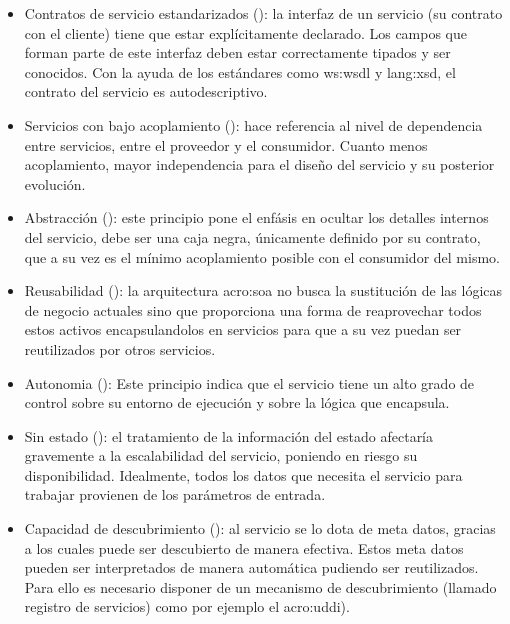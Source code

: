 
\begin{itemize}
  \item Contratos de servicio estandarizados (): la interfaz de un servicio (su contrato con el cliente) tiene que estar explícitamente declarado. Los campos  que forman parte de este interfaz deben estar correctamente tipados y ser conocidos. Con la ayuda de los estándares como \gls{ws:wsdl} y \gls{lang:xsd}, el contrato del servicio es autodescriptivo.

  \item Servicios con bajo acoplamiento (): hace referencia al nivel de dependencia entre servicios, entre el proveedor y el consumidor. Cuanto menos acoplamiento, mayor independencia para el diseño del servicio y su posterior evolución.

  \item Abstracción (): este principio pone el enfásis en ocultar los detalles internos del servicio, debe ser una caja negra, únicamente definido por su contrato, que a su vez es el mínimo acoplamiento posible con el consumidor del mismo.

  \item Reusabilidad (): la arquitectura \gls{acro:soa} no busca la sustitución de las lógicas de negocio actuales sino que proporciona una forma de reaprovechar todos estos activos encapsulandolos en servicios para que a su vez puedan ser reutilizados por otros servicios.

  \item Autonomia (): Este principio indica que el servicio tiene un alto grado de control sobre su entorno de ejecución y sobre la lógica que encapsula.

  \item Sin estado (): el tratamiento de la información del estado afectaría gravemente a la escalabilidad del servicio, poniendo en riesgo su disponibilidad. Idealmente, todos los datos que necesita el servicio para trabajar provienen de los parámetros de entrada.

  \item Capacidad de descubrimiento (): al servicio se lo dota de meta datos, gracias a los cuales puede ser descubierto de manera efectiva. Estos meta datos pueden ser interpretados de manera automática pudiendo ser reutilizados. Para ello es necesario disponer de un mecanismo de descubrimiento (llamado registro de servicios) como por ejemplo el \gls{acro:uddi}).


\end{itemize}
